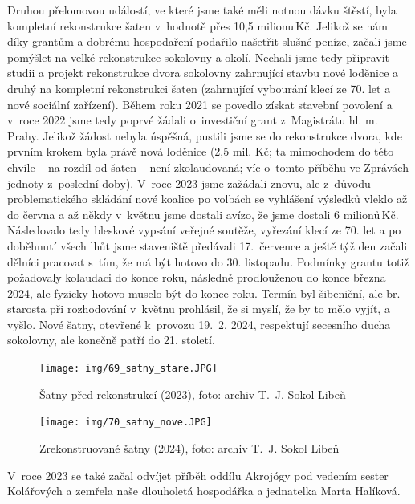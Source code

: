 \documentclass[a5paper, 11pt, twoside]{article}
\begin{document}
Druhou přelomovou událostí, ve které jsme také měli notnou dávku štěstí,
byla kompletní rekonstrukce šaten v~hodnotě přes 10,5 milionu\,Kč.
Jelikož se nám díky grantům a dobrému hospodaření podařilo našetřit
slušné peníze, začali jsme pomýšlet na velké rekonstrukce sokolovny a
okolí. Nechali jsme tedy připravit studii a projekt rekonstrukce dvora
sokolovny zahrnující stavbu nové loděnice a druhý na kompletní
rekonstrukci šaten (zahrnující vybourání klecí ze 70. let a nové
sociální zařízení). Během roku 2021 se povedlo získat stavební povolení
a v~roce 2022 jsme tedy poprvé žádali o~investiční grant z~Magistrátu
hl. m. Prahy. Jelikož žádost nebyla úspěšná, pustili jsme se do
rekonstrukce dvora, kde prvním krokem byla právě nová loděnice (2,5 mil.
Kč; ta mimochodem do této chvíle -- na rozdíl od šaten -- není
zkolaudovaná; víc o~tomto příběhu ve Zprávách jednoty z~poslední doby).
V~roce 2023 jsme zažádali znovu, ale z~důvodu problematického skládání
nové koalice po volbách se vyhlášení výsledků vleklo až do června a až
někdy v~květnu jsme dostali avízo, že jsme dostali 6 milionů\,Kč.
Následovalo tedy bleskové vypsání veřejné soutěže, vyřezání klecí ze 70.
let a po doběhnutí všech lhůt jsme staveniště předávali 17.~července a
ještě týž den začali dělníci pracovat s~tím, že má být hotovo do 30.
listopadu. Podmínky grantu totiž požadovaly kolaudaci do konce roku,
následně prodlouženou do konce března 2024, ale fyzicky hotovo muselo
být do konce roku. Termín byl šibeniční, ale br. starosta při
rozhodování v~květnu prohlásil, že si myslí, že by to mělo vyjít, a
vyšlo. Nové šatny, otevřené k~provozu 19.~2. 2024, respektují secesního
ducha sokolovny, ale konečně patří do 21. století.

\begin{figure}[hp]
  \centering 
  \texttt{[image: img/69\_satny\_stare.JPG]}
  \caption*{Šatny před rekonstrukcí (2023), foto: archiv T.~J. Sokol Libeň}
\end{figure}

\begin{figure}[hp]
  \centering 
  \texttt{[image: img/70\_satny\_nove.JPG]}
  \caption*{Zrekonstruované šatny (2024), foto: archiv T.~J. Sokol Libeň}
\end{figure}

V~roce 2023 se také začal odvíjet příběh oddílu Akrojógy pod vedením
sester Kolářových a zemřela naše dlouholetá hospodářka a jednatelka
Marta Halíková.

\clearpage
\end{document}
